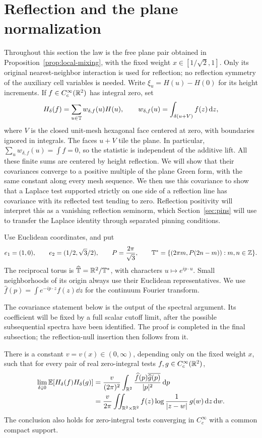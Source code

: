 \section{Reflection and the plane normalization}
\label{sec:plane}

Throughout this section the law is the free plane pair obtained in
Proposition~\ref{prop:local-mixing}, with the fixed weight
$x\in[1/\sqrt2,1]$.  Only its original nearest-neighbor interaction is used
for reflection; no reflection symmetry of the auxiliary cell variables is
needed.  Write $\xi_u=H(u)-H(0)$ for its height increments.  If
$f\in C_c^\infty(\mathbb R^2)$ has integral zero, set
\[
 H_\delta(f)=\sum_{u\in\mathbb T}w_{\delta,f}(u)H(u),\qquad
 w_{\delta,f}(u)=\int_{\delta(u+V)}f(z)\,\mathrm d z,
\]
where $V$ is the closed unit-mesh hexagonal face centered at zero, with
boundaries ignored in integrals.  The faces $u+V$ tile the plane.  In
particular, $\sum_u w_{\delta,f}(u)=\int f=0$, so the statistic is
independent of the additive lift.  All these finite sums are centered by
height reflection.  We will show that their covariances converge to a
positive multiple of the plane Green form, with the same constant along
every mesh sequence.  We then use this covariance to show that a Laplace
test supported strictly on one side of a reflection line has covariance
with its reflected test tending to zero.  Reflection positivity will
interpret this as a vanishing reflection seminorm, which
Section~\ref{sec:pins} will use to transfer the Laplace identity through
separated pinning conditions.

Use Euclidean coordinates, and put
\[
 e_1=(1,0),\qquad e_2=(1/2,\sqrt3/2),\qquad
 P=\frac{2\pi}{\sqrt3},\qquad
 \mathbb T^*=\{(2\pi m,P(2n-m)):m,n\in\mathbb Z\}.
\]
The reciprocal torus is $\widehat{\mathbb T}=\mathbb R^2/\mathbb T^*$, with characters
$u\mapsto e^{ip\cdot u}$.  Small neighborhoods of its origin always use
their Euclidean representatives.  We use
$\widehat f(p)=\int e^{-ip\cdot z}f(z)\dd z$ for the continuum Fourier
transform.

The covariance statement below is the output of the spectral argument.
Its coefficient will be fixed by a full scalar cutoff limit, after the
possible subsequential spectra have been identified.  The proof is completed
in the final subsection; the reflection-null insertion then follows from it.

\begin{proposition}
\label{prop:plane-covariance}
There is a constant $v=v(x)\in(0,\infty)$, depending only on the fixed
weight $x$, such that for every pair of real zero-integral tests
$f,g\in C_c^\infty(\mathbb R^2)$,
\begin{align}
 \lim_{\delta\downarrow0}\mathbb E[H_\delta(f)H_\delta(g)]
 &=\frac{v}{(2\pi)^2}
       \int_{\mathbb R^2}\frac{\widehat f(p)\overline{\widehat g(p)}}{|p|^2}
                  \,\mathrm d p                                      \label{plane:eq:covariance}\\
 &=\frac{v}{2\pi}\iint_{\mathbb R^2\times\mathbb R^2}
          f(z)\log\frac1{|z-w|}\,g(w)\,\mathrm d z\,\mathrm d w.              \notag
\end{align}
The conclusion also holds for zero-integral tests converging in
$C_c^\infty$ with a common compact support.
\end{proposition}

